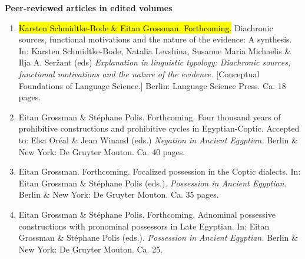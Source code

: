 \documentclass[letterpaper,11pt]{article}
\newcommand{\resheading}[1]{
\vspace*{6pt}
{\large \colorbox{mygrey}{\begin{minipage}{\textwidth}{\textbf{#1 \vphantom{p\^{E}}}}\end{minipage}}}
}
\begin{document}
\resheading{Peer-reviewed articles in edited volumes} 
\vspace*{6pt}
\hspace*{-10.5pt}
\vspace*{6pt}
\begin{enumerate}[resume]


\item	\hl{Karsten Schmidtke-Bode \& Eitan Grossman. Forthcoming.} Diachronic sources, functional motivations and the nature of the evidence: A synthesis. In: Karsten Schmidtke-Bode, Natalia Levshina, Susanne Maria Michaelis \& Ilja A. Ser\v{z}ant (eds) \textit{Explanation in linguistic typology: Diachronic sources, functional motivations and the nature of the evidence.} [Conceptual Foundations of Language Science.] Berlin: Language Science Press. Ca. 18 pages.

\item Eitan Grossman \& St\'ephane Polis. Forthcoming. Four thousand years of prohibitive constructions and prohibitive cycles in Egyptian-Coptic. Accepted to: Elsa Or\'eal \& Jean Winand (eds.) \textit{Negation in Ancient Egyptian.} Berlin \& New York: De Gruyter Mouton. Ca. 40 pages.

\item Eitan Grossman. Forthcoming. Focalized possession in the Coptic dialects. In: Eitan Grossman \& St\'ephane Polis (eds.). \textit{Possession in Ancient Egyptian.} Berlin \& New York: De Gruyter Mouton.  Ca. 35 pages.

\item	Eitan Grossman \& St\'ephane Polis. Forthcoming. Adnominal possessive constructions with pronominal possessors in Late Egyptian. In: Eitan Grossman \& St\'ephane Polis (eds.). \textit{Possession in Ancient Egyptian.} Berlin \& New York: De Gruyter Mouton. Ca. 25.


\end{enumerate}
\end{document}
